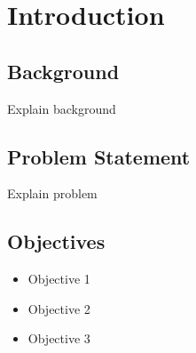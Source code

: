 \chapter{Introduction}

\section{Background}

Explain background

\section{Problem Statement}

Explain problem

\section{Objectives}

\begin{itemize}
\item Objective 1
\item Objective 2
\item Objective 3
\end{itemize}